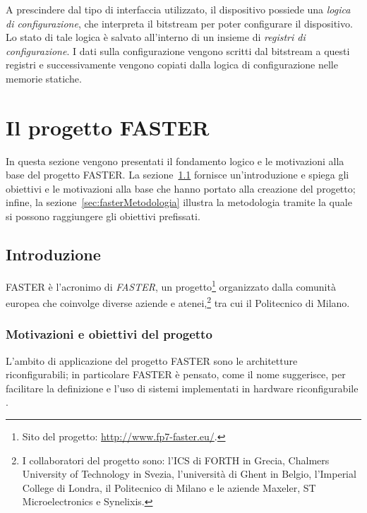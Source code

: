 A prescindere dal tipo di interfaccia utilizzato, il dispositivo possiede una
\emph{logica di configurazione}, che interpreta il bitstream per poter configurare
il dispositivo. Lo stato di tale logica è salvato all'interno di un insieme di \emph{registri di configurazione}.
I dati sulla configurazione vengono scritti dal bitstream a questi registri e successivamente
vengono copiati dalla logica di configurazione nelle memorie statiche.


\section[Il progetto \acs{FASTER}]{Il progetto \acs{FASTER}}
\label{sec:progettoFASTER}
In questa sezione vengono presentati il fondamento logico e le motivazioni alla 
base del progetto \acs{FASTER}. La sezione~\ref{subsec:fasterIntro} fornisce 
un'introduzione e spiega gli obiettivi e le motivazioni alla 
base che hanno portato alla creazione del progetto; infine, la
sezione~\ref{sec:fasterMetodologia} illustra la metodologia tramite la quale si possono 
raggiungere gli obiettivi prefissati.




\subsection{Introduzione}
\label{subsec:fasterIntro}
\acs{FASTER} \cite{FasterFactsheet} è l'acronimo di \emph{\acl{FASTER}}, un progetto\footnote{Sito del 
progetto: \url{http://www.fp7-faster.eu/}.} organizzato dalla comunità europea 
che coinvolge diverse aziende e atenei,\footnote{I collaboratori del progetto 
sono: l'\ac{ICS} di \ac{FORTH} in Grecia, Chalmers University of Technology in 
Svezia, l'università di Ghent in Belgio, l'Imperial College di Londra, il 
Politecnico di Milano e le aziende Maxeler, ST Microelectronics e Synelixis.} 
tra cui il Politecnico di Milano.

\subsubsection{Motivazioni e obiettivi del progetto}
L'ambito di applicazione del progetto \ac{FASTER} sono le architetture 
riconfigurabili; in particolare \ac{FASTER} è pensato, come il nome 
suggerisce, per facilitare la definizione e l'uso di sistemi implementati in 
hardware riconfigurabile \cite{FasterPaper}.

